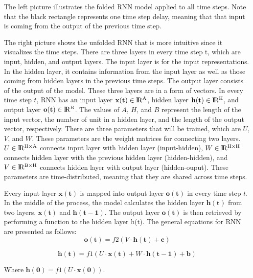 The left picture illustrates the folded RNN model applied to all time steps. Note that the black rectangle represents one time step delay, meaning that that input is coming from the output of the previous time step. 

The right picture shows the unfolded RNN that is more intuitive since it visualizes the time steps. There are three layers in every time step t, which are input, hidden, and output layers. The input layer is for the input representations. In the hidden layer, it contains information from the input layer as well as those coming from hidden layers in the previous time steps. The output layer consists of the output of the model. These three layers are in a form of vectors. In every time step $t$, RNN has an input layer $ \mathbf{x(t)} \in {\rm I\!R^{A}} $, hidden layer $ \mathbf{h(t)} \in {\rm I\!R^{H}} $, and output layer $ \mathbf{o(t)} \in {\rm I\!R^{B}} $. The values of $A$, $H$, and $B$ represent the length of the input vector, the number of unit in a hidden layer, and the length of the output vector, respectively. There are three parameters that will be trained, which are $U$, $V$, and $W.$ These parameters are the weight matrices for connecting two layers. $ U \in {\rm I\!R^{H \times A }}$ connects input layer with hidden layer (input-hidden), $ W \in {\rm I\!R^{H \times H}}$ connects hidden layer with the previous hidden layer (hidden-hidden), and $ V \in {\rm I\!R^{B \times H}}$ connects hidden layer with output layer (hidden-ouput). These parameters are time-distributed, meaning that they are shared across time steps. 

Every input layer $ \mathbf{x(t)} $ is mapped into output layer $ \mathbf{o(t)} $ in every time step $t$. In the middle of the process, the model calculates the hidden layer $ \mathbf{h(t)} $ from two layers, $ \mathbf{x(t)} $ and $ \mathbf{h(t-1)} $. The output layer $ \mathbf{o(t)} $ is then retrieved by performing a function to the hidden layer h(t). The general equations for RNN are presented as follows:
\begin{equation}
\label{eq:rnnot}
\mathbf{o(t)} = f2(V \cdot \mathbf{h(t)} + \mathbf{c})
\end{equation}

\begin{equation}
\label{eq:rnnht}
\mathbf{h(t)} = f1(U \cdot \mathbf{x(t)} + W \cdot \mathbf{h(t-1)} + \mathbf{b})
\end{equation}

Where $ \mathbf{h(0)} = f1(U \cdot \mathbf{x(0)}) $.

